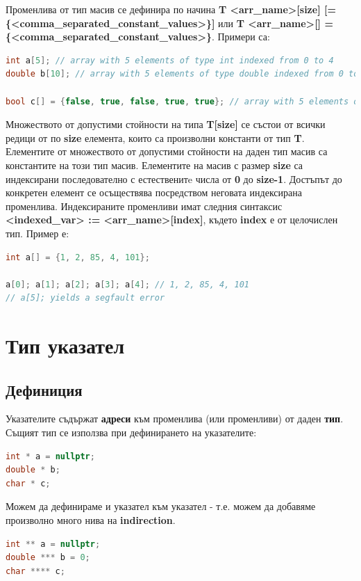 \documentclass[fleqn,12pt]{article}
\begin{document}
Променлива от тип масив се дефинира по начина \textbf{T <arr\_name>[size] [= \{<comma\_separated\_constant\_values>\}]} или \textbf{T <arr\_name>[] = \{<comma\_separated\_constant\_values>\}}.
Примери са:

\begin{lstlisting}[language=C++, caption=Example array definitions]
int a[5]; // array with 5 elements of type int indexed from 0 to 4
double b[10]; // array with 5 elements of type double indexed from 0 to 9

bool c[] = {false, true, false, true, true}; // array with 5 elements of type bool
\end{lstlisting}

Множеството от допустими стойности на типа \textbf{T[size]} се състои от всички редици от по \textbf{size} елемента, които са произволни константи от тип \textbf{T}.
Елементите от множеството от допустими стойности на даден тип масив са константите на този тип масив.
\bigbreak
Елементите на масив с размер \textbf{size} са индексирани последователно с естественитe числа от \textbf{0} до \textbf{size-1}.
Достъпът до конкретен елемент се осъществява посредством неговата индексирана променлива.
Индексираните променливи имат следния синтаксис \textbf{<indexed\_var> := <arr\_name>[index]}, където \textbf{index} е от целочислен тип.
Пример е:

\begin{lstlisting}[language=C++, caption=Example array item access]
int a[] = {1, 2, 85, 4, 101};

a[0]; a[1]; a[2]; a[3]; a[4]; // 1, 2, 85, 4, 101
// a[5]; yields a segfault error
\end{lstlisting}

\section{Тип указател}
\subsection{Дефиниция}
Указателите съдържат \textbf{адреси} към променлива (или променливи) от даден \textbf{тип}.
Същият тип се използва при дефинирането на указателите:

\begin{lstlisting}[language=C++, caption=Pointer example]
int * a = nullptr;
double * b;
char * c;
\end{lstlisting}

Можем да дефинираме и указател към указател - т.е. можем да добавяме произволно много нива на \textbf{indirection}.
\begin{lstlisting}[language=C++, caption=Pointer example]
int ** a = nullptr;
double *** b = 0;
char **** c;
\end{lstlisting}
\end{document}
